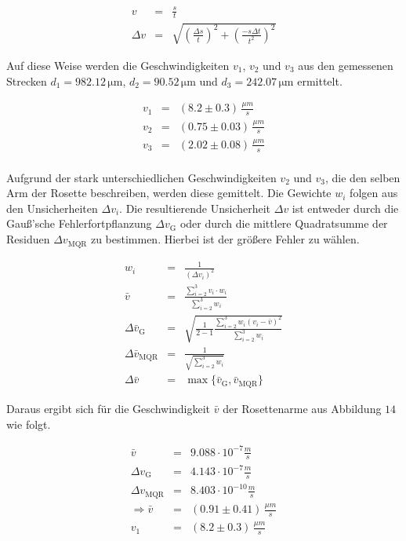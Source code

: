 \documentclass[12pt,a4paper]{scrartcl}
\numberwithin{equation}{section} %
\renewcommand{\[}{} %
\renewcommand{\]}{\noindent} %
\begin{document}
\[
\begin{eqnarray}
    v &=& \frac{s}{t} \\
    \Delta v &=&
        \sqrt{
            \left(\frac{\Delta s}{t}\right)^2
            + \left(\frac{-s \Delta t}{t^2}\right)^2
        }
\end{eqnarray}
\]

Auf diese Weise werden die Geschwindigkeiten \(v_1\), \(v_2\) und
\(v_3\) aus den gemessenen Strecken \(d_1=982.12\mathrm{\,\mu m}\),
\(d_2=90.52\mathrm{\,\mu m}\) und \(d_3=242.07\mathrm{\,\mu m}\)
ermittelt.

\[
\begin{eqnarray}
    v_1 &=& (8.2 \pm 0.3) \,\frac{\mu m}{s} \\
    v_2 &=& (0.75 \pm 0.03) \,\frac{\mu m}{s} \\
    v_3 &=& (2.02 \pm 0.08) \,\frac{\mu m}{s} \\
\end{eqnarray}
\]

Aufgrund der stark unterschiedlichen Geschwindigkeiten \(v_2\) und
\(v_3\), die den selben Arm der Rosette beschreiben, werden diese
gemittelt. Die Gewichte \(w_i\) folgen aus den Unsicherheiten
\(\Delta v_i\). Die resultierende Unsicherheit \(\Delta v\) ist entweder
durch die Gauß'sche Fehlerfortpflanzung \(\Delta v_\mathrm{G}\) oder
durch die mittlere Quadratsumme der Residuen \(\Delta v_\mathrm{MQR}\)
zu bestimmen. Hierbei ist der größere Fehler zu wählen.

\[
\begin{eqnarray}
    w_i &=& \frac{1}{(\Delta v_i)^2} \\
    \bar{v} &=& \frac{\sum_{i=2}^{3} v_i\cdot w_i}{\sum_{i=2}^{3} w_i} \\
    \Delta \bar{v}_\mathrm{G} &=&
        \sqrt{\frac{1}{2-1}\frac{\sum_{i=2}^{3}w_i(v_i-\bar{v})^2}{\sum_{i=2}^{3}w_i}} \\
    \Delta \bar{v}_\mathrm{MQR} & = & \frac{1}{\sqrt{\sum_{i=2}^{3}w_i}} \\
    \Delta \bar{v} &=& \max\{\bar{v}_\mathrm{G}, \bar{v}_\mathrm{MQR}\}
\end{eqnarray}
\]

Daraus ergibt sich für die Geschwindigkeit \(\bar v\) der Rosettenarme
aus Abbildung \(14\) wie folgt.

\[
\begin{eqnarray}
    \bar{v} &=& 9.088 \cdot 10^{-7} \frac{m}{s} \\
    \Delta v_\mathrm{G} &=& 4.143 \cdot 10^{-7} \frac{m}{s} \\
    \Delta v_\mathrm{MQR} &=& 8.403 \cdot 10^{-10} \frac{m}{s} \\
    \Rightarrow \bar{v} &=& (0.91 \pm 0.41) \,\frac{\mu m}{s} \\
    v_1 &=& (8.2 \pm 0.3) \,\frac{\mu m}{s}
\end{eqnarray}
\]
\end{document}
